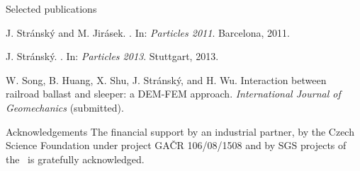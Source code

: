\documentclass{phdposter}
\begin{document}
\postervspace

\begin{posterframe}{\textwidth}{Selected publications}
	\begin{enumerate}[label={[\arabic*]},leftmargin=1.2em,labelsep=.3em]
		\fontsize{29.5}{36} \selectfont
		\item J. Stránský and M. Jirásek. . In: \textit{Particles 2011}. Barcelona, 2011.
		\item J. Stránský. . In: \textit{Particles 2013}. Stuttgart, 2013.
		\item W. Song, B. Huang, X. Shu, J. Stránský, and H. Wu. Interaction between railroad ballast and sleeper: a DEM-FEM approach. \textit{International Journal of Geomechanics} (submitted).
	\end{enumerate}
\end{posterframe}

\postervspace

\begin{posterframe}{\textwidth}{Acknowledgements}
The financial support by an industrial partner, by the Czech Science Foundation under project GAČR 106/08/1508 and by SGS projects of the \university\ is gratefully acknowledged.
\end{posterframe}

\hspace{\fill}
\end{document}
